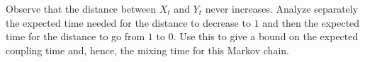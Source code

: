 \documentclass[11pt]{article}
\begin{document}
\begin{enumerate}
Observe that the distance between $X_t$ and $Y_t$ never increases. Analyze separately the expected time needed for the distance to decrease to $1$ and then the expected time for the distance to go from $1$ to $0$. Use this to give a bound on the expected coupling time and, hence, the mixing time for this Markov chain.

\end{enumerate}
\end{document}
